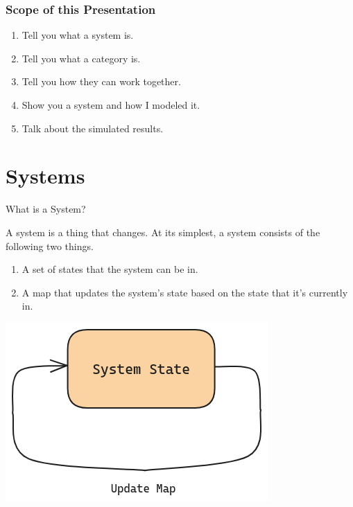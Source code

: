 \documentclass{beamer}
\begin{document}
\begin{frame}
    \frametitle{Scope of this Presentation}
    \begin{large}
        \begin{enumerate}
            \item Tell you what a system is.
            \item Tell you what a category is.
            \item Tell you how they can work together.
            \item Show you a system and how I modeled it.
            \item Talk about the simulated results.
        \end{enumerate}
    \end{large}

\end{frame}



\section{Systems}


\begin{frame}{What is a System?}
    \begin{large}
        A system is a thing that changes. At its simplest, a system consists of the following two things.

        \begin{enumerate}
            \item A set of states that the system can be in.
            \item A map that updates the system's state based on the state that it's currently in.
        \end{enumerate}
    \end{large}


    \begin{center}
        \includegraphics[scale=0.35]{system_diagram_closed.png}
    \end{center}

\end{frame}
\end{document}
